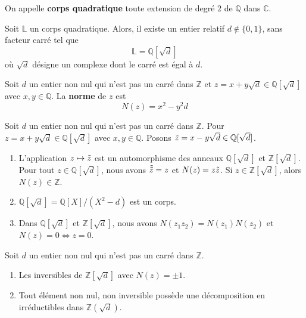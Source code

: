 	\begin{definition}
		On appelle \textbf{corps quadratique} toute extension de degré $2$ de $\mathbb{Q}$ dans $\mathbb{C}$.
	\end{definition}
	
	\begin{theorem}
		Soit $\mathbb{L}$ un corps quadratique. Alors, il existe un entier relatif $d \notin \{ 0, 1 \}$, sans facteur carré tel que
		\[ \mathbb{L} = \mathbb{Q}[\sqrt{d}] \]
		où $\sqrt{d}$ désigne un complexe dont le carré est égal à $d$.
	\end{theorem}
	
	
	\begin{definition}
		Soit $d$ un entier non nul qui n'est pas un carré dans $\mathbb{Z}$ et $z = x+y\sqrt{d} \in \mathbb{Q}[\sqrt{d}]$ avec $x, y \in \mathbb{Q}$. La \textbf{norme} de $z$ est
		\[ N(z) = x^2-y^2d \]
	\end{definition}
	
	\begin{proposition}
		Soit $d$ un entier non nul qui n'est pas un carré dans $\mathbb{Z}$. Pour $z = x+y\sqrt{d} \in \mathbb{Q}[\sqrt{d}]$ avec $x,y \in \mathbb{Q}$. Posons $\Tilde{z} = x-y\sqrt{d} \in \mathbb{Q}[\sqrt{d}]$.
		\begin{enumerate}[label=(\roman*)]
			\item L'application $z \mapsto \Tilde{z}$ est un automorphisme des anneaux $\mathbb{Q}[\sqrt{d}]$ et $\mathbb{Z}[\sqrt{d}]$. Pour tout $z \in \mathbb{Q}[\sqrt{d}]$, nous avons $\Tilde{\Tilde{z}} = z$ et $N(z) = z \Tilde{z}$. Si $z \in \mathbb{Z}[\sqrt{d}]$, alors $N(z) \in \mathbb{Z}$.
			\item $\mathbb{Q}[\sqrt{d}] = \mathbb{Q}[X]/(X^2 - d)$ est un corps.
			\item Dans $\mathbb{Q}[\sqrt{d}]$ et $\mathbb{Z}[\sqrt{d}]$, nous avons $N(z_1 z_2) = N(z_1) N(z_2)$ et $N(z) = 0 \iff z = 0$.
		\end{enumerate}
	\end{proposition}
	
	\begin{proposition}
		Soit $d$ un entier non nul qui n'est pas un carré dans $\mathbb{Z}$.
		\begin{enumerate}[label=(\roman*)]
			\item Les inversibles de $\mathbb{Z}[\sqrt{d}]$ avec $N(z) = \pm 1$.
			\item Tout élément non nul, non inversible possède une décomposition en irréductibles dans $\mathbb{Z}(\sqrt{d})$.
		\end{enumerate}
	\end{proposition}
	
